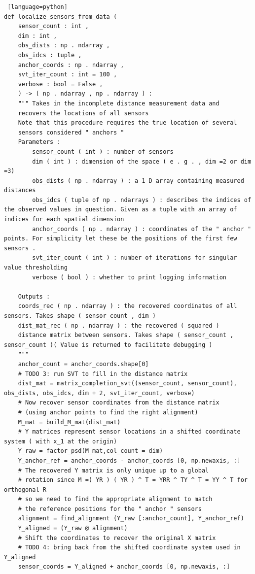 \documentclass[a4paper, 12pt]{article}
\begin{document}
\begin{lstlisting} [language=python]
def localize_sensors_from_data (
    sensor_count : int ,
    dim : int ,
    obs_dists : np . ndarray ,
    obs_idcs : tuple ,
    anchor_coords : np . ndarray ,
    svt_iter_count : int = 100 ,
    verbose : bool = False ,
    ) -> ( np . ndarray , np . ndarray ) :
    """ Takes in the incomplete distance measurement data and
    recovers the locations of all sensors
    Note that this procedure requires the true location of several
    sensors considered " anchors "
    Parameters :
        sensor_count ( int ) : number of sensors
        dim ( int ) : dimension of the space ( e . g . , dim =2 or dim =3)
        obs_dists ( np . ndarray ) : a 1 D array containing measured distances
        obs_idcs ( tuple of np . ndarrays ) : describes the indices of the observed values in question. Given as a tuple with an array of indices for each spatial dimension
        anchor_coords ( np . ndarray ) : coordinates of the " anchor " points. For simplicity let these be the positions of the first few sensors .
        svt_iter_count ( int ) : number of iterations for singular value thresholding
        verbose ( bool ) : whether to print logging information
    
    Outputs :
    coords_rec ( np . ndarray ) : the recovered coordinates of all sensors. Takes shape ( sensor_count , dim )
    dist_mat_rec ( np . ndarray ) : the recovered ( squared )
    distance matrix between sensors. Takes shape ( sensor_count , sensor_count )( Value is returned to facilitate debugging )
    """
    anchor_count = anchor_coords.shape[0]
    # TODO 3: run SVT to fill in the distance matrix
    dist_mat = matrix_completion_svt((sensor_count, sensor_count), obs_dists, obs_idcs, dim + 2, svt_iter_count, verbose)
    # Now recover sensor coordinates from the distance matrix
    # (using anchor points to find the right alignment)
    M_mat = build_M_mat(dist_mat)
    # Y matrices represent sensor locations in a shifted coordinate system ( with x_1 at the origin)
    Y_raw = factor_psd(M_mat,col_count = dim)
    Y_anchor_ref = anchor_coords - anchor_coords [0, np.newaxis, :]
    # The recovered Y matrix is only unique up to a global
    # rotation since M =( YR ) ( YR ) ^ T = YRR ^ TY ^ T = YY ^ T for orthogonal R
    # so we need to find the appropriate alignment to match
    # the reference positions for the " anchor " sensors
    alignment = find_alignment (Y_raw [:anchor_count], Y_anchor_ref)
    Y_aligned = (Y_raw @ alignment)
    # Shift the coordinates to recover the original X matrix
    # TODO 4: bring back from the shifted coordinate system used in Y_aligned
    sensor_coords = Y_aligned + anchor_coords [0, np.newaxis, :]
    

\end{lstlisting}
\end{document}
